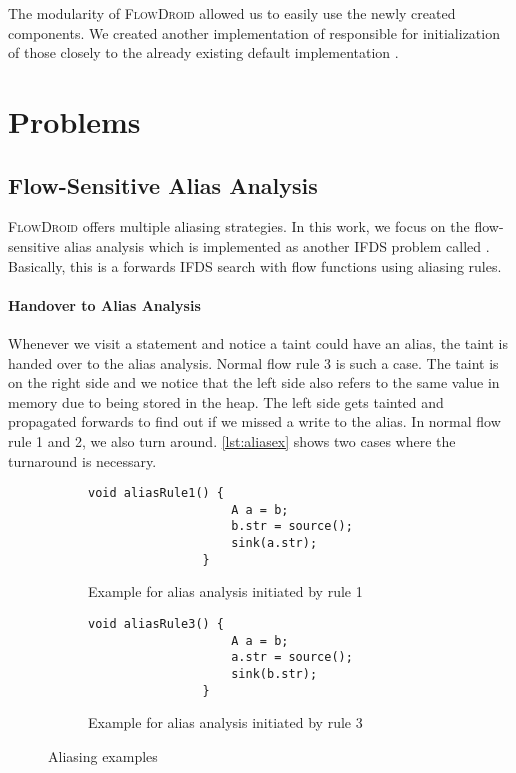 \documentclass[../draft.tex]{subfiles}
\begin{document}
    The modularity of \textsc{FlowDroid} allowed us to easily use the newly created components. We created another implementation of  responsible for initialization of those closely to the already existing default implementation .

    \section{Problems}\label{s:problems}

    \subsection{Flow-Sensitive Alias Analysis}
    \textsc{FlowDroid} offers multiple aliasing strategies.
    In this work, we focus on the flow-sensitive alias analysis which is implemented as another IFDS problem called . Basically, this is a forwards IFDS search with flow functions using aliasing rules. 

    \paragraph{Handover to Alias Analysis}
    Whenever we visit a statement and notice a taint could have an alias, the taint is handed over to the alias analysis. 
    Normal flow rule 3 is such a case. The taint is on the right side and we notice that the left side also refers to the same value in memory due to being stored in the heap. The left side gets tainted and propagated forwards to find out if we missed a write to the alias.
    In normal flow rule 1 and 2, we also turn around. \autoref{lst:aliasex} shows two cases where the turnaround is necessary.

    \begin{figure}[ht]
        \centering
        \begin{subfigure}[b]{0.45\textwidth}
            \centering
            \begin{lstlisting}[gobble=16]
                void aliasRule1() {
                    A a = b;
                    b.str = source();
                    sink(a.str);
                }
            \end{lstlisting}
            \caption{Example for alias analysis initiated by rule 1}
        \end{subfigure}
        \hfill
        \begin{subfigure}[b]{0.45\textwidth}
            \centering
            \begin{lstlisting}[gobble=16]
                void aliasRule3() {
                    A a = b;
                    a.str = source();
                    sink(b.str);
                }
            \end{lstlisting}
            \caption{Example for alias analysis initiated by rule 3}
        \end{subfigure}
        \caption{Aliasing examples}
        \label{lst:aliasex}
    \end{figure}
\end{document}
